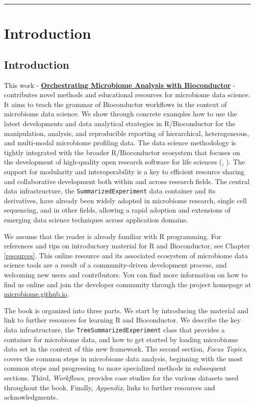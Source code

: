 \documentclass[
]{book}
\begin{document}
\begin{center}\rule{0.5\linewidth}{0.5pt}\end{center}

\hypertarget{part-introduction}{%
\part{Introduction}\label{part-introduction}}

\hypertarget{intro}{%
\chapter{Introduction}\label{intro}}

This work - \href{https://microbiome.github.io/OMA/}{\textbf{Orchestrating Microbiome Analysis with Bioconductor}} \citep{OMA} - contributes novel
methods and educational resources for microbiome data science. It
aims to teach the grammar of Bioconductor workflows in the context of
microbiome data science. We show through concrete examples how to use
the latest developments and data analytical strategies in
R/Bioconductor for the manipulation, analysis, and reproducible
reporting of hierarchical, heterogeneous, and multi-modal microbiome
profiling data. The data science methodology is tightly integrated
with the broader R/Bioconductor ecosystem that focuses on the
development of high-quality open research software for life
sciences (\citet{Gentleman2004}, \citet{Huber2015}). The support for modularity and
interoperability is a key to efficient resource sharing and
collaborative development both within and across research fields. The
central data infrastructure, the \texttt{SummarizedExperiment} data container
and its derivatives, have already been widely adopted in microbiome
research, single cell sequencing, and in other fields, allowing a
rapid adoption and extensions of emerging data science techniques
across application domains.

We assume that the reader is already familiar with R programming. For
references and tips on introductory material for R and Bioconductor,
see Chapter \ref{resources}. This online resource and its associated
ecosystem of microbiome data science tools are a result of a
community-driven development process, and welcoming new users and
contributors. You can find more information on how to find us online
and join the developer community through the project homepage at
\href{https://microbiome.github.io}{microbiome.github.io}.

The book is organized into three parts. We start by introducing the
material and link to further resources for learning R and
Bioconductor. We describe the key data infrastructure, the
\texttt{TreeSummarizedExperiment} class that provides a container for
microbiome data, and how to get started by loading microbiome data set
in the context of this new framework. The second section, \emph{Focus
Topics}, covers the common steps in microbiome data analysis,
beginning with the most common steps and progressing to more
specialized methods in subsequent sections. Third, \emph{Workflows},
provides case studies for the various datasets used throughout the
book. Finally, \emph{Appendix}, links to further resources and
acknowledgments.
\end{document}
